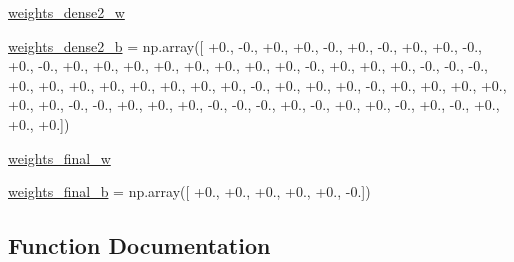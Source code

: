 \begin{DoxyCompactItemize}
\item 
\hyperlink{namespacepybullet-gym_1_1pybulletgym_1_1examples_1_1roboschool-weights_1_1enjoy___t_f___walker2_d_py_bullet_env__v0__2017may_a62870403e32972f1f6df086b67ad60e7}{weights\+\_\+dense2\+\_\+w}
\item 
\hyperlink{namespacepybullet-gym_1_1pybulletgym_1_1examples_1_1roboschool-weights_1_1enjoy___t_f___walker2_d_py_bullet_env__v0__2017may_a90d07a99219e43e782d47fffe1ae9e8e}{weights\+\_\+dense2\+\_\+b} = np.\+array(\mbox{[} +0., -\/0., +0., +0., -\/0., +0., -\/0., +0., +0., -\/0., +0., -\/0., +0., +0., +0., +0., +0., +0., +0., +0., -\/0., +0., +0., +0., -\/0., -\/0., -\/0., +0., +0., +0., +0., +0., +0., +0., +0., -\/0., +0., +0., +0., -\/0., +0., +0., +0., +0., +0., +0., -\/0., -\/0., +0., +0., +0., -\/0., -\/0., -\/0., +0., -\/0., +0., +0., -\/0., +0., -\/0., +0., +0., +0.\mbox{]})
\item 
\hyperlink{namespacepybullet-gym_1_1pybulletgym_1_1examples_1_1roboschool-weights_1_1enjoy___t_f___walker2_d_py_bullet_env__v0__2017may_a9f7621dbc858c6ed1a32a51d4d979f50}{weights\+\_\+final\+\_\+w}
\item 
\hyperlink{namespacepybullet-gym_1_1pybulletgym_1_1examples_1_1roboschool-weights_1_1enjoy___t_f___walker2_d_py_bullet_env__v0__2017may_a5b9316e3c4c56f88b6f4677edc89ebe8}{weights\+\_\+final\+\_\+b} = np.\+array(\mbox{[} +0., +0., +0., +0., +0., -\/0.\mbox{]})
\end{DoxyCompactItemize}


\subsection{Function Documentation}
